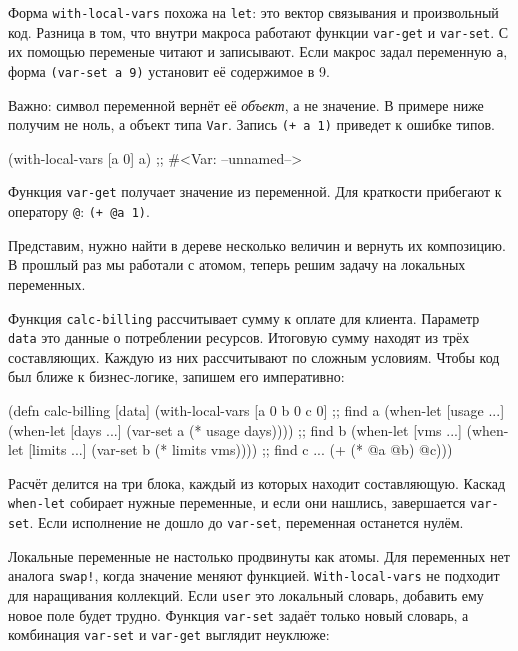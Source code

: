 Форма \verb|with-local-vars| похожа на \verb|let|: это вектор связывания и
произвольный код. Разница в том, что внутри макроса работают функции
\verb|var-get| и \verb|var-set|. С их помощью переменые читают и
записывают. Если макрос задал переменную \verb|a|, форма
\verb|(var-set a 9)| установит её содержимое в 9.

Важно: символ переменной вернёт её \emph{объект}, а не значение. В примере ниже
получим не ноль, а объект типа \verb|Var|. Запись \verb|(+ a 1)| приведет к
ошибке типов.

\begin{english}
  \begin{clojure}
(with-local-vars [a 0] a)
;; #<Var: --unnamed-->
  \end{clojure}
\end{english}

Функция \verb|var-get| получает значение из переменной. Для краткости
прибегают к оператору \verb|@|: \verb|(+ @a 1)|.

Представим, нужно найти в дереве несколько величин и вернуть их композицию. В
прошлый раз мы работали с атомом, теперь решим задачу на локальных переменных.

Функция \verb|calc-billing| рассчитывает сумму к оплате для клиента. Параметр
\verb|data| это данные о потреблении ресурсов. Итоговую сумму находят из трёх
составляющих. Каждую из них рассчитывают по сложным условиям. Чтобы код был
ближе к бизнес-логике, запишем его императивно:

\begin{english}
  \begin{clojure}
(defn calc-billing [data]
  (with-local-vars
    [a 0 b 0 c 0]
    ;; find a
    (when-let [usage ...]
      (when-let [days ...]
        (var-set a (* usage days))))
    ;; find b
    (when-let [vms ...]
      (when-let [limits ...]
        (var-set b (* limits vms))))
    ;; find c ...
    (+ (* @a @b) @c)))
  \end{clojure}
\end{english}

Расчёт делится на три блока, каждый из которых находит составляющую. Каскад
\verb|when-let| собирает нужные переменные, и если они нашлись, завершается
\verb|var-set|. Если исполнение не дошло до \verb|var-set|, переменная
останется нулём.

Локальные переменные не настолько продвинуты как атомы. Для переменных нет
аналога \verb|swap!|, когда значение меняют функцией. \verb|With-local-vars|
не подходит для наращивания коллекций. Если \verb|user| это локальный словарь,
добавить ему новое поле будет трудно. Функция \verb|var-set| задаёт только
новый словарь, а комбинация \verb|var-set| и \verb|var-get| выглядит
неуклюже:

